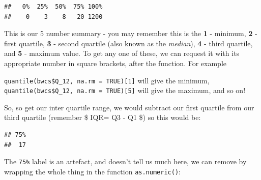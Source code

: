 \documentclass[
]{book}
\newenvironment{Shaded}{\begin{snugshade}}{\end{snugshade}}
\newcommand{\AttributeTok}[1]{\textcolor[rgb]{0.77,0.63,0.00}{#1}}
\newcommand{\ConstantTok}[1]{\textcolor[rgb]{0.00,0.00,0.00}{#1}}
\newcommand{\DecValTok}[1]{\textcolor[rgb]{0.00,0.00,0.81}{#1}}
\newcommand{\FunctionTok}[1]{\textcolor[rgb]{0.00,0.00,0.00}{#1}}
\newcommand{\NormalTok}[1]{#1}
\newcommand{\SpecialCharTok}[1]{\textcolor[rgb]{0.00,0.00,0.00}{#1}}
\begin{document}
\begin{Shaded}
\end{Shaded}

\begin{verbatim}
##   0%  25%  50%  75% 100% 
##    0    3    8   20 1200
\end{verbatim}

This is our 5 number summary - you may remember this is the \textbf{1} - minimum, \textbf{2} - first quartile, \textbf{3} - second quartile (also known as the \emph{median}), \textbf{4} - third quartile, and \textbf{5} - maximum value. To get any one of these, we can request it with its appropriate number in square brackets, after the function. For example

\texttt{quantile(bwcs\$Q\_12,\ na.rm\ =\ TRUE){[}1{]}} will give the minimum, \texttt{quantile(bwcs\$Q\_12,\ na.rm\ =\ TRUE){[}5{]}} will give the maximum, and so on!

So, so get our inter quartile range, we would subtract our first quartile from our third quartile (remember \$ IQR= Q3 - Q1 \$) so this would be:

\begin{Shaded}
\end{Shaded}

\begin{verbatim}
## 75% 
##  17
\end{verbatim}

The \texttt{75\%} label is an artefact, and doesn't tell us much here, we can remove by wrapping the whole thing in the function \texttt{as.numeric()}:

\begin{Shaded}
\end{Shaded}
\end{document}
